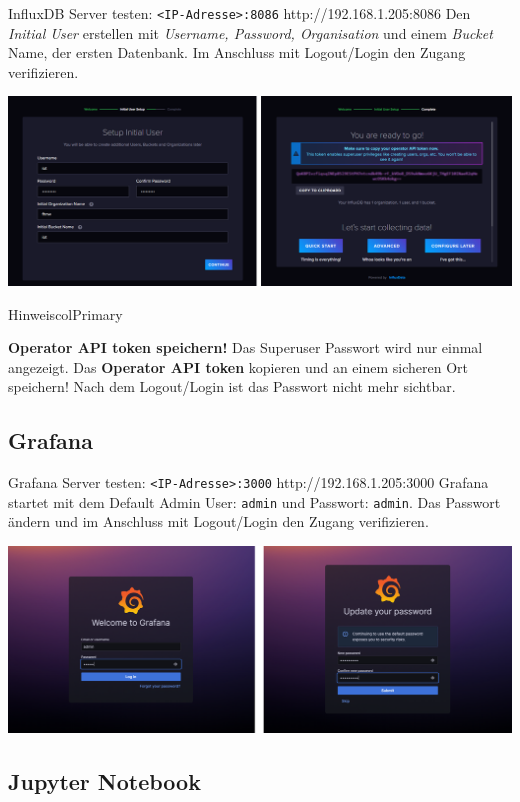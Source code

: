 \documentclass[
  11pt,
  a4paperpaper,
  oneside, openany  ,captions=tableheading
]{scrbook}
\theoremstyle{definition}
\theoremstyle{remark}
\begin{document}
InfluxDB Server testen:
\texttt{\textless{}IP-Adresse\textgreater{}:8086}
http://192.168.1.205:8086 Den \emph{Initial User} erstellen mit
\emph{Username, Password, Organisation} und einem \emph{Bucket} Name,
der ersten Datenbank. Im Anschluss mit Logout/Login den Zugang
verifizieren.

\includegraphics{images/5200_iot_influxdb_setup.png}

\begin{boxtitle}{Hinweis}{colPrimary}

\textbf{Operator API token speichern!} Das Superuser Passwort wird nur
einmal angezeigt. Das \textbf{Operator API token} kopieren und an einem
sicheren Ort speichern! Nach dem Logout/Login ist das Passwort nicht
mehr sichtbar.

\end{boxtitle}

\subsection{Grafana}\label{grafana}

Grafana Server testen: \texttt{\textless{}IP-Adresse\textgreater{}:3000}
http://192.168.1.205:3000 Grafana startet mit dem Default Admin User:
\texttt{admin} und Passwort: \texttt{admin}. Das Passwort ändern und im
Anschluss mit Logout/Login den Zugang verifizieren.

\includegraphics{images/5200_iot_grafana_setup.png}

\subsection{Jupyter Notebook}\label{jupyter-notebook}
\end{document}
